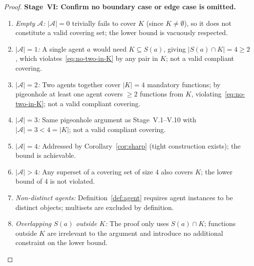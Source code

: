 \documentclass[12pt]{article}
\theoremstyle{definition}
\begin{document}
\begin{proof}
\medskip
\noindent\textbf{Stage~VI: Confirm no boundary case or edge case is
omitted.}
\begin{enumerate}
    \item[VI.1] \emph{Empty $\mathcal{A}$:} $|\mathcal{A}|=0$ trivially
                fails to cover $K$ (since $K \neq \emptyset$), so it
                does not constitute a valid covering set; the lower bound
                is vacuously respected.
    \item[VI.2] \emph{$|\mathcal{A}|=1$:} A single agent $a$ would need
                $K \subseteq S(a)$, giving $|S(a) \cap K| = 4 \geq 2$,
                which violates~\eqref{eq:no-two-in-K} by any pair in $K$;
                not a valid compliant covering.
    \item[VI.3] \emph{$|\mathcal{A}|=2$:} Two agents together cover
                $|K|=4$ mandatory functions; by pigeonhole at least one
                agent covers $\geq 2$ functions from $K$,
                violating~\eqref{eq:no-two-in-K}; not a valid compliant
                covering.
    \item[VI.4] \emph{$|\mathcal{A}|=3$:} Same pigeonhole argument as
                Stage~V.1--V.10 with $|\mathcal{A}|=3 < 4 = |K|$; not a
                valid compliant covering.
    \item[VI.5] \emph{$|\mathcal{A}|=4$:} Addressed by
                Corollary~\ref{cor:sharp} (tight construction exists);
                the bound is achievable.
    \item[VI.6] \emph{$|\mathcal{A}|>4$:} Any superset of a covering
                set of size $4$ also covers $K$; the lower bound of $4$
                is not violated.
    \item[VI.7] \emph{Non-distinct agents:} Definition~\ref{def:agent}
                requires agent instances to be distinct objects;
                multisets are excluded by definition.
    \item[VI.8] \emph{Overlapping $S(a)$ outside $K$:} The proof
                only uses $S(a) \cap K$; functions outside $K$ are
                irrelevant to the argument and introduce no additional
                constraint on the lower bound.
\end{enumerate}


\end{proof}
\end{document}
